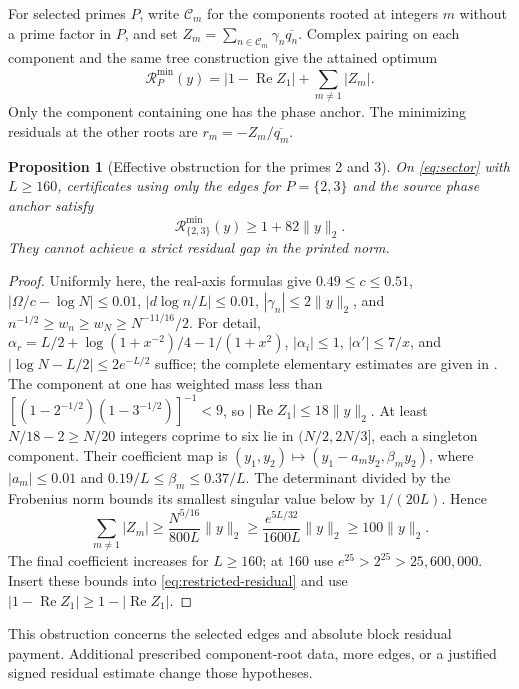 \documentclass[11pt]{article}
\newtheorem{proposition}[theorem]{Proposition}
\theoremstyle{definition}
\theoremstyle{remark}
\newcommand{\Rea}{\operatorname{Re}}
\begin{document}
For selected primes $P$, write $\mathcal C_m$ for the components rooted
at integers $m$ without a prime factor in $P$, and set
$Z_m=\sum_{n\in\mathcal C_m}\gamma_n\overline{q_n}$.
Complex pairing on each component and the same tree construction give
the attained optimum
\begin{equation}
 \mathcal R_P^{\min}(y)=|1-\Rea Z_1|+\sum_{m\ne1}|Z_m|.
 \label{eq:restricted-residual}
\end{equation}
Only the component containing one has the phase anchor. The minimizing
residuals at the other roots are $r_m=-Z_m/\overline{q_m}$.

\begin{proposition}[Effective obstruction for the primes 2 and 3]
\label{prop:two-prime-obstruction}
On \eqref{eq:sector} with $L\ge160$, certificates using only the edges
for $P=\{2,3\}$ and the source phase anchor satisfy
\begin{equation}
 \mathcal R_{\{2,3\}}^{\min}(y)\ge1+82\|y\|_2.
 \label{eq:two-prime-obstruction}
\end{equation}
They cannot achieve a strict residual gap in the printed norm.
\end{proposition}
\begin{proof}
Uniformly here, the real-axis formulas give $0.49\le c\le0.51$,
$|\Omega/c-\log N|\le0.01$, $|d\log n/L|\le0.01$,
$|\gamma_n|\le2\|y\|_2$, and
$n^{-1/2}\ge w_n\ge w_N\ge N^{-11/16}/2$.
For detail, $\alpha_r=L/2+\log(1+x^{-2})/4-1/(1+x^2)$,
$|\alpha_i|\le1$, $|\alpha'|\le7/x$, and
$|\log N-L/2|\le2e^{-L/2}$ suffice; the complete elementary estimates
are given in \cite{transportcontinuation}.
The component at one has weighted mass less than
$[(1-2^{-1/2})(1-3^{-1/2})]^{-1}<9$, so
$|\Rea Z_1|\le18\|y\|_2$.
At least $N/18-2\ge N/20$ integers coprime to six lie in
$(N/2,2N/3]$, each a singleton component. Their coefficient map is
$(y_1,y_2)\mapsto(y_1-a_my_2,\beta_my_2)$, where
$|a_m|\le0.01$ and $0.19/L\le\beta_m\le0.37/L$.
The determinant divided by the Frobenius norm bounds its smallest
singular value below by $1/(20L)$. Hence
\[
 \sum_{m\ne1}|Z_m|\ge\frac{N^{5/16}}{800L}\|y\|_2
 \ge\frac{e^{5L/32}}{1600L}\|y\|_2\ge100\|y\|_2.
\]
The final coefficient increases for $L\ge160$; at 160 use
$e^{25}>2^{25}>25{,}600{,}000$. Insert these bounds into
\eqref{eq:restricted-residual} and use
$|1-\Rea Z_1|\ge1-|\Rea Z_1|$.
\end{proof}

This obstruction concerns the selected edges and absolute block residual
payment. Additional prescribed component-root data, more edges, or a
justified signed residual estimate change those hypotheses.
\end{document}
